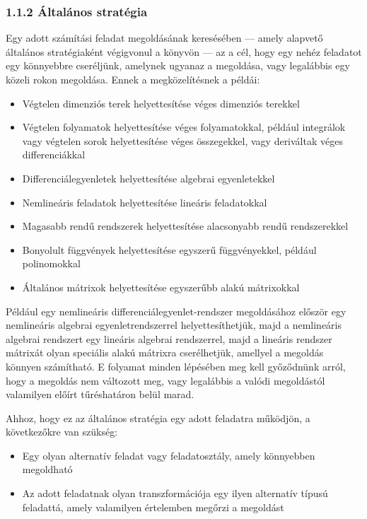 \documentclass[
  magyar,
  11pt]{article}
\providecommand{\tightlist}{%
  \setlength{\itemsep}{0pt}\setlength{\parskip}{0pt}}
\begin{document}
\subsubsection{1.1.2 Általános
stratégia}\label{uxe1ltaluxe1nos-stratuxe9gia}

Egy adott számítási feladat megoldásának keresésében --- amely alapvető
általános stratégiaként végigvonul a könyvön --- az a cél, hogy egy
nehéz feladatot egy könnyebbre cseréljünk, amelynek ugyanaz a megoldása,
vagy legalábbis egy közeli rokon megoldása. Ennek a megközelítésnek a
példái:

\begin{itemize}
\tightlist
\item
  Végtelen dimenziós terek helyettesítése véges dimenziós terekkel
\item
  Végtelen folyamatok helyettesítése véges folyamatokkal, például
  integrálok vagy végtelen sorok helyettesítése véges összegekkel, vagy
  deriváltak véges differenciákkal
\item
  Differenciálegyenletek helyettesítése algebrai egyenletekkel
\item
  Nemlineáris feladatok helyettesítése lineáris feladatokkal
\item
  Magasabb rendű rendszerek helyettesítése alacsonyabb rendű
  rendszerekkel
\item
  Bonyolult függvények helyettesítése egyszerű függvényekkel, például
  polinomokkal
\item
  Általános mátrixok helyettesítése egyszerűbb alakú mátrixokkal
\end{itemize}

Például egy nemlineáris differenciálegyenlet-rendszer megoldásához
először egy nemlineáris algebrai egyenletrendszerrel helyettesíthetjük,
majd a nemlineáris algebrai rendszert egy lineáris algebrai rendszerrel,
majd a lineáris rendszer mátrixát olyan speciális alakú mátrixra
cserélhetjük, amellyel a megoldás könnyen számítható. E folyamat minden
lépésében meg kell győződnünk arról, hogy a megoldás nem változott meg,
vagy legalábbis a valódi megoldástól valamilyen előírt tűréshatáron
belül marad.

Ahhoz, hogy ez az általános stratégia egy adott feladatra működjön, a
következőkre van szükség:

\begin{itemize}
\tightlist
\item
  Egy olyan alternatív feladat vagy feladatosztály, amely könnyebben
  megoldható
\item
  Az adott feladatnak olyan transzformációja egy ilyen alternatív típusú
  feladattá, amely valamilyen értelemben megőrzi a megoldást
\end{itemize}
\end{document}
